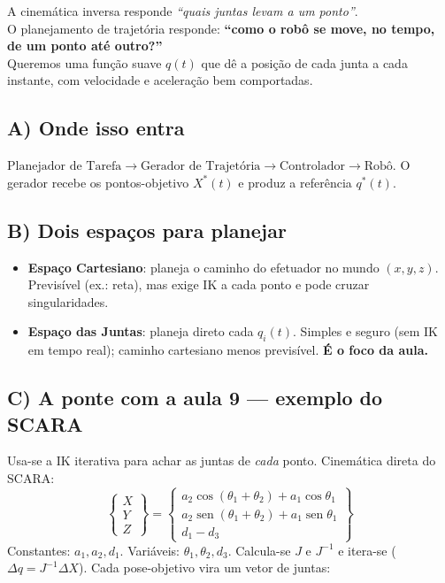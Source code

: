 \documentclass[11pt,a4paper]{article}
\begin{document}
\begin{tcolorbox}[colback=verde!6,colframe=verde!50]
A cinemática inversa responde \emph{``quais juntas levam a um ponto''}.\\
O planejamento de trajetória responde:
\textbf{``como o robô se move, no tempo, de um ponto até outro?''}\\[3pt]
Queremos uma função suave $q(t)$ que dê a posição de cada junta a cada
instante, com velocidade e aceleração bem comportadas.
\end{tcolorbox}

\subsection*{A) Onde isso entra}
$\text{Planejador de Tarefa} \to \boxed{\text{Gerador de Trajetória}} \to
 \text{Controlador} \to \text{Robô}$.
O gerador recebe os pontos-objetivo $X^{*}(t)$ e produz a referência $q^{*}(t)$.

\subsection*{B) Dois espaços para planejar}
\begin{itemize}[leftmargin=1.4em]
  \item \textcolor{azul}{\textbf{Espaço Cartesiano}}: planeja o caminho do
        efetuador no mundo $(x,y,z)$. Previsível (ex.: reta), mas exige IK a
        cada ponto e pode cruzar singularidades.
  \item \textcolor{vinho}{\textbf{Espaço das Juntas}}: planeja direto cada
        $q_i(t)$. Simples e seguro (sem IK em tempo real); caminho cartesiano
        menos previsível. \textbf{É o foco da aula.}
\end{itemize}

\subsection*{C) A ponte com a aula 9 — exemplo do SCARA}
Usa-se a IK iterativa para achar as juntas de \emph{cada} ponto. Cinemática
direta do SCARA:
\[
\begin{Bmatrix} X\\ Y\\ Z \end{Bmatrix}
=
\begin{Bmatrix}
a_2\cos(\theta_1+\theta_2) + a_1\cos\theta_1\\
a_2\operatorname{sen}(\theta_1+\theta_2) + a_1\operatorname{sen}\theta_1\\
d_1 - d_3
\end{Bmatrix}
\]
Constantes: $a_1,a_2,d_1$. \quad Variáveis: $\theta_1,\theta_2,d_3$.
Calcula-se $J$ e $J^{-1}$ e itera-se ($\Delta q = J^{-1}\Delta X$).
Cada pose-objetivo vira um vetor de juntas:
\end{document}
